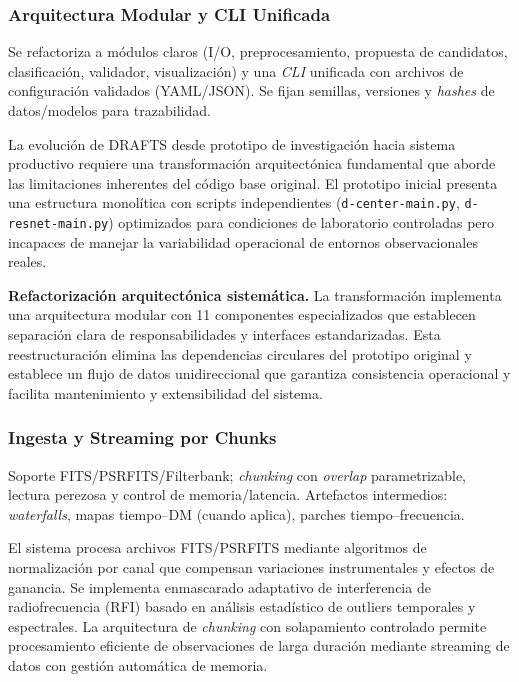 \subsubsection{Arquitectura Modular y CLI Unificada}

Se refactoriza a módulos claros (I/O, preprocesamiento, propuesta de candidatos, clasificación, validador, visualización) y una \textit{CLI} unificada con archivos de configuración validados (YAML/JSON). Se fijan semillas, versiones y \textit{hashes} de datos/modelos para trazabilidad.

La evolución de DRAFTS desde prototipo de investigación hacia sistema productivo requiere una transformación arquitectónica fundamental que aborde las limitaciones inherentes del código base original. El prototipo inicial presenta una estructura monolítica con scripts independientes (\texttt{d-center-main.py}, \texttt{d-resnet-main.py}) optimizados para condiciones de laboratorio controladas pero incapaces de manejar la variabilidad operacional de entornos observacionales reales.

\noindent\textbf{Refactorización arquitectónica sistemática.} La transformación implementa una arquitectura modular con 11 componentes especializados que establecen separación clara de responsabilidades y interfaces estandarizadas. Esta reestructuración elimina las dependencias circulares del prototipo original y establece un flujo de datos unidireccional que garantiza consistencia operacional y facilita mantenimiento y extensibilidad del sistema.

\subsubsection{Ingesta y Streaming por Chunks}

Soporte FITS/PSRFITS/Filterbank; \emph{chunking} con \emph{overlap} parametrizable, lectura perezosa y control de memoria/latencia. Artefactos intermedios: \textit{waterfalls}, mapas tiempo--DM (cuando aplica), parches tiempo--frecuencia.

El sistema procesa archivos FITS/PSRFITS mediante algoritmos de normalización por canal que compensan variaciones instrumentales y efectos de ganancia. Se implementa enmascarado adaptativo de interferencia de radiofrecuencia (RFI) basado en análisis estadístico de outliers temporales y espectrales. La arquitectura de \emph{chunking} con solapamiento controlado permite procesamiento eficiente de observaciones de larga duración mediante streaming de datos con gestión automática de memoria.

